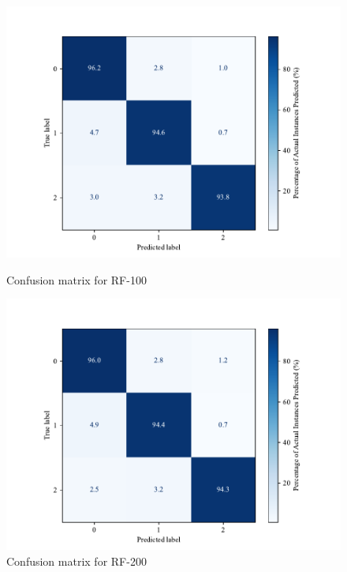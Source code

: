     
    \begin{figure}[H]
    \centering
    \begin{minipage}[b]{0.45\textwidth}
      \centering
      \includegraphics[width=\textwidth]{images/confusion_matrix_random_forest100.pdf}
      \caption{Confusion matrix for RF-100}
      \label{fig:confusion_rf100}
    \end{minipage}
    \hfill
    \begin{minipage}[b]{0.45\textwidth}
      \centering
      \includegraphics[width=\textwidth]{images/confusion_matrix_random_forest200.pdf}
      \caption{Confusion matrix for RF-200}
      \label{fig:confusion_rf200}
    \end{minipage}
    \end{figure}

